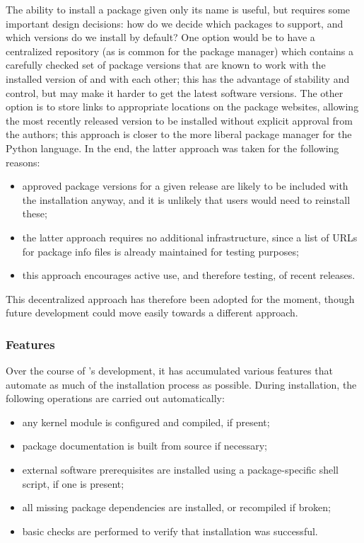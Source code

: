 The ability to install a package given only its name is useful, but requires
some important design decisions: how do we decide which packages to support, and
which versions do we install by default?  One option would be to have a
centralized repository (as is common for the  package manager) which
contains a carefully checked set of package versions that are known to work with
the installed version of \GAP and with each other; this has the advantage of
stability and control, but may make it harder to get the latest software
versions.  The other option is to store links to appropriate locations on the
package websites, allowing the most recently released version to be installed
without explicit approval from the \GAP authors; this approach is closer to the
more liberal  package manager for the Python language.
In the end, the latter approach was taken for the following reasons:
\begin{itemize}
\item approved package versions for a given release are likely to be included
  with the \GAP installation anyway, and it is unlikely that users would need
  to reinstall these;
\item the latter approach requires no additional infrastructure, since a
  list of URLs for package info files is already maintained for testing purposes;
\item this approach encourages active use, and therefore testing, of recent releases.
\end{itemize}
This decentralized approach has therefore been adopted for the moment, though
future development could move easily towards a different approach.

\subsubsection{Features}

Over the course of 's development, it has accumulated
various features that automate as much of the installation process as possible.
During installation, the following operations are carried out automatically:
\begin{itemize}
\item any kernel module is configured and compiled, if present;
\item package documentation is built from source if necessary;
\item external software prerequisites are installed using a package-specific
  shell script, if one is present;
\item all missing package dependencies are installed, or recompiled if broken;
\item basic checks are performed to verify that installation was successful.
\end{itemize}

